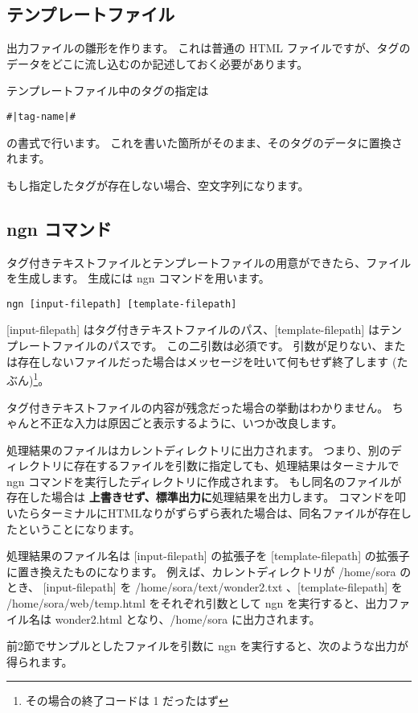 \documentclass[a4j]{jsarticle}
\begin{document}




\subsection{テンプレートファイル}
出力ファイルの雛形を作ります。
これは普通の HTML ファイルですが、タグのデータをどこに流し込むのか記述しておく必要があります。

テンプレートファイル中のタグの指定は
\begin{lstlisting}[caption=タグ指定の書式]
#|tag-name|#
\end{lstlisting}
の書式で行います。
これを書いた箇所がそのまま、そのタグのデータに置換されます。

もし指定したタグが存在しない場合、空文字列になります。




\subsection{ngn コマンド}
タグ付きテキストファイルとテンプレートファイルの用意ができたら、ファイルを生成します。
生成には ngn コマンドを用います。

\begin{lstlisting}[caption=ngn コマンドの使い方]
  ngn [input-filepath] [template-filepath]
\end{lstlisting}

[input-filepath] はタグ付きテキストファイルのパス、[template-filepath] はテンプレートファイルのパスです。
この二引数は必須です。
引数が足りない、または存在しないファイルだった場合はメッセージを吐いて何もせず終了します (たぶん)\footnote{その場合の終了コードは 1 だったはず}。

タグ付きテキストファイルの内容が残念だった場合の挙動はわかりません。
ちゃんと不正な入力は原因ごと表示するように、いつか改良します。

処理結果のファイルはカレントディレクトリに出力されます。
つまり、別のディレクトリに存在するファイルを引数に指定しても、処理結果はターミナルで ngn コマンドを実行したディレクトリに作成されます。
もし同名のファイルが存在した場合は \textbf{上書きせず、標準出力に}処理結果を出力します。
コマンドを叩いたらターミナルにHTMLなりがずらずら表れた場合は、同名ファイルが存在したということになります。

処理結果のファイル名は [input-filepath] の拡張子を [template-filepath] の拡張子に置き換えたものになります。
例えば、カレントディレクトリが /home/sora のとき、 [input-filepath] を /home/sora/text/wonder2.txt 、[template-filepath] を /home/sora/web/temp.html をそれぞれ引数として ngn を実行すると、出力ファイル名は wonder2.html となり、/home/sora に出力されます。

前2節でサンプルとしたファイルを引数に ngn を実行すると、次のような出力が得られます。


\end{document}
